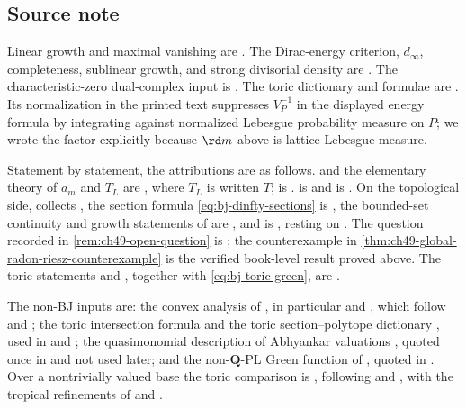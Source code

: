 \subsection{Source note}
\label{sec:ch49-source-note}

Linear growth and maximal vanishing are \cite[\S\S1.5 and~4.5]{BJ22}.  The
Dirac-energy criterion, $d_\infty$, completeness, sublinear growth, and
strong divisorial density are \cite[\S\S11.1--11.5]{BJ22}.  The
characteristic-zero dual-complex input is \cite[Appendix~A]{BJ22}.  The
toric dictionary and formulae are \cite[Appendix~B]{BJ22}.  Its normalization
in the printed text suppresses
$V_P^{-1}$ in the displayed energy formula by integrating against
normalized Lebesgue probability measure on $P$; we wrote the factor
explicitly because $\rd m$ above is lattice Lebesgue measure.

Statement by statement, the attributions are as follows.
 and the elementary theory of $a_m$ and
$T_L$ are \cite[\S1.5]{BJ22}, where $T_L$ is written $T$;
 is
\cite[Definition~1.26 and Proposition~4.38]{BJ22}.
 is \cite[Proposition~11.1]{BJ22} and
 is
\cite[Proposition~11.3]{BJ22}.  On the topological side,
 collects
\cite[Theorems~11.4, 11.9 and~11.13 and Corollary~11.15]{BJ22}, the
section formula \eqref{eq:bj-dinfty-sections} is
\cite[Lemma~11.7]{BJ22}, the bounded-set continuity and growth statements of
 are
\cite[Theorems~11.11 and~11.12]{BJ22}, and
 is
\cite[Theorem~11.18]{BJ22}, resting on \cite[Appendix~A]{BJ22}.  The
question recorded in \cref{rem:ch49-open-question} is
\cite[Question~11.16]{BJ22}; the counterexample in
\cref{thm:ch49-global-radon-riesz-counterexample} is the verified
book-level result proved above.  The toric statements
 and , together
with \eqref{eq:bj-toric-green}, are \cite[Appendix~B]{BJ22}.

The non-BJ inputs are: the convex analysis of , in
particular  and
, which follow \cite{Roc70} and
\cite{Sch14}; the toric intersection formula
\cite[Theorem~13.4.3]{CLS11} and the toric section--polytope dictionary
\cite[Ch.~6]{CLS11}, used in  and
; the quasimonomial description of Abhyankar
valuations \cite[\S3]{JM12}, quoted once in
 and not used later; and the
non-$\mathbf Q$-PL Green function of \cite[Theorem~60 and Examples~63, 65]{BJGreen24}, quoted
in .  Over a nontrivially valued base the
toric comparison is , following \cite{CL06}
and \cite{BGPS14}, with the tropical refinements of \cite{BGJKK25} and
\cite{Vil20}.

